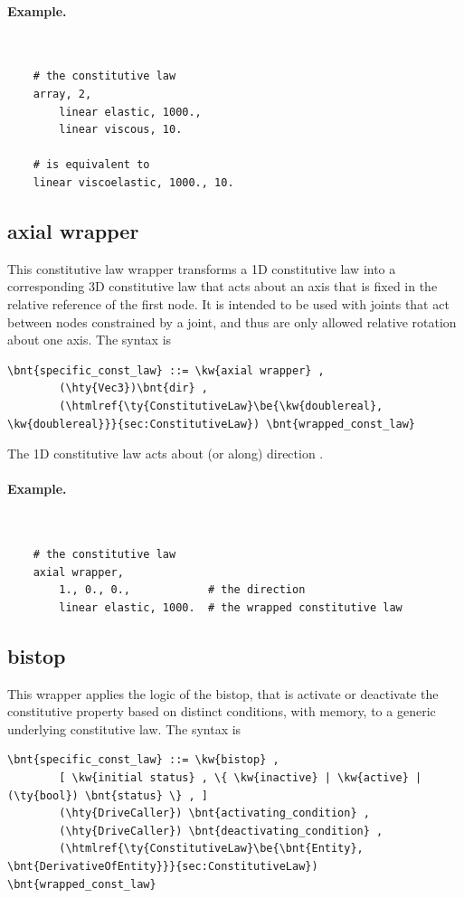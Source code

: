 \paragraph{Example.} \
\begin{verbatim}
    # the constitutive law
    array, 2,
        linear elastic, 1000.,
        linear viscous, 10.

    # is equivalent to
    linear viscoelastic, 1000., 10.
\end{verbatim}


\subsection{axial wrapper}
This constitutive law wrapper transforms a 1D constitutive law into a corresponding 3D constitutive law that acts about an axis that is fixed in the relative reference of the first node.  It is intended to be used with  joints that act between nodes constrained by a  joint, and thus are only allowed relative rotation about one axis.
The syntax is
\begin{Verbatim}[commandchars=\\\{\}]
    \bnt{specific_const_law} ::= \kw{axial wrapper} ,
        (\hty{Vec3})\bnt{dir} ,
        (\htmlref{\ty{ConstitutiveLaw}\be{\kw{doublereal}, \kw{doublereal}}}{sec:ConstitutiveLaw}) \bnt{wrapped_const_law}
\end{Verbatim}
The 1D constitutive law  acts about (or along) direction .

\paragraph{Example.} \
\begin{verbatim}
    # the constitutive law
    axial wrapper,
        1., 0., 0.,            # the direction
        linear elastic, 1000.  # the wrapped constitutive law
\end{verbatim}


\subsection{bistop}
This wrapper applies the logic of the bistop, that is activate or deactivate
the constitutive property based on distinct conditions, with memory,
to a generic underlying constitutive law.
The syntax is
\begin{Verbatim}[commandchars=\\\{\}]
    \bnt{specific_const_law} ::= \kw{bistop} ,
        [ \kw{initial status} , \{ \kw{inactive} | \kw{active} | (\ty{bool}) \bnt{status} \} , ]
        (\hty{DriveCaller}) \bnt{activating_condition} ,
        (\hty{DriveCaller}) \bnt{deactivating_condition} ,
        (\htmlref{\ty{ConstitutiveLaw}\be{\bnt{Entity}, \bnt{DerivativeOfEntity}}}{sec:ConstitutiveLaw}) \bnt{wrapped_const_law}
\end{Verbatim}


